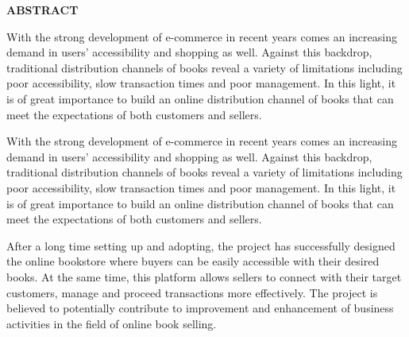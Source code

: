 \documentclass[../DoAn.tex]{subfiles}
\begin{document}
\begin{center}
    \Large{\textbf{ABSTRACT}}\\
\end{center}
\vspace{1cm}


With the strong development of e-commerce in recent years comes an increasing demand in users’ accessibility and shopping as well.  Against this backdrop, traditional distribution channels of books reveal a variety of limitations including poor accessibility, slow transaction times and poor management. In this light, it is of great importance to build an online distribution channel of books that can meet the expectations of both customers and sellers.

With the strong development of e-commerce in recent years comes an increasing demand in users’ accessibility and shopping as well.  Against this backdrop, traditional distribution channels of books reveal a variety of limitations including poor accessibility, slow transaction times and poor management. In this light, it is of great importance to build an online distribution channel of books that can meet the expectations of both customers and sellers.

After a long time setting up and adopting, the project has successfully designed the online bookstore where  buyers can be easily accessible with their desired books. At the same time, this platform allows sellers to connect with their target customers, manage and proceed transactions more effectively. The project is believed to potentially  contribute to improvement and enhancement of business activities in the field of online book selling.
\end{document}
